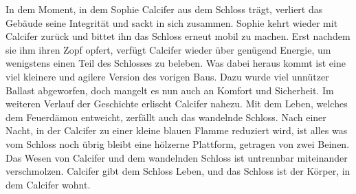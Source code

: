 In dem Moment, in dem Sophie Calcifer aus dem Schloss trägt, verliert das Gebäude seine Integrität und sackt in sich zusammen. Sophie kehrt wieder mit Calcifer zurück und bittet ihn das Schloss erneut mobil zu machen. Erst nachdem sie ihm ihren Zopf opfert, verfügt Calcifer wieder über genügend Energie, um wenigstens einen Teil des Schlosses zu beleben. Was dabei heraus kommt ist eine viel kleinere und agilere Version des vorigen Baus. Dazu wurde viel unnützer Ballast abgeworfen, doch mangelt es nun auch an Komfort und Sicherheit. 
Im weiteren Verlauf der Geschichte erlischt Calcifer nahezu. Mit dem Leben, welches dem Feuerdämon entweicht, zerfällt auch das wandelnde Schloss. Nach einer Nacht, in der Calcifer zu einer kleine blauen Flamme reduziert wird, ist alles was vom Schloss noch übrig bleibt eine hölzerne Plattform, getragen von zwei Beinen. Das Wesen von Calcifer und dem wandelnden Schloss ist untrennbar miteinander verschmolzen. Calcifer gibt dem Schloss Leben, und das Schloss ist der Körper, in dem Calcifer wohnt. 